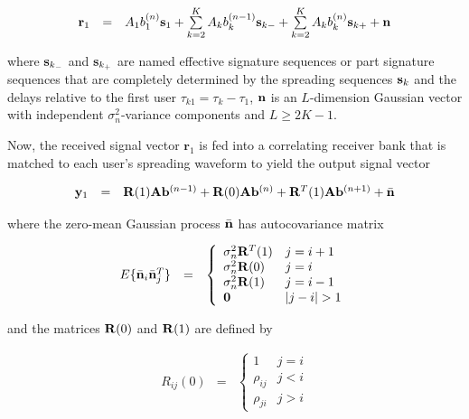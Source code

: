 \documentclass[a4paper,11pt,fleqn]{article}
\newcommand{\br}{{\mathbf r}}
\newcommand{\bA}{{\mathbf A}}
\newcommand{\bb}{{\bf b}}
\newcommand{\bs}{{\bf s}}
\newcommand{\bn}{{\bf n}}
\newcommand{\by}{{\bf y}}
\newcommand{\bR}{{\bf R}}
\begin{document}
\begin{equation}
\begin{array}{rcl}
\br_1&=&A_1b_1^{(n)}\bs_1+\sum\limits_{k=2}^{K}A_k b_k^{(n-1)}
\bs_{k-}+\sum\limits_{k=2}^{K}A_k b_k^{(n)} \bs_{k+} + \bn
\end{array} \label{r}
\end{equation}

\noindent where $\bs_{k_-}$ and $\bs_{k_+}$ are named effective
signature sequences or part signature sequences that are
completely determined by the spreading sequences $\bs_k$ and the
delays relative to the first user $\tau_{k1}=\tau_k-\tau_1$, $\bn$
is an $L$-dimension Gaussian vector with independent
$\sigma_n^2$-variance components and $L \geq 2K-1$.

Now, the received signal vector $\br_1$ is fed into a correlating
receiver bank that is matched to each user's spreading waveform to
yield the output signal vector

\begin{equation}
\begin{array}{rcl}
\by_1&=&\bR(1)\bA\bb^{(n-1)}+\bR(0)\bA\bb^{(n)}+\bR^T(1)\bA\bb^{(n+1)}+\bar{\bn}
\end{array}
\end{equation}

\noindent where the zero-mean Gaussian process $\bar{\bn}$ has
autocovariance matrix

\begin{equation}
\begin{array}{rcl}
E\{\bar{\bn}_i\bar{\bn}_j^T\}&=&\left\{
\begin{array}{ll}
\sigma_n^2\bR^T(1)&j=i+1\\ \sigma_n^2\bR(0)&j=i\\
\sigma_n^2\bR(1)&j=i-1\\ \mathbf{0}&|j-i|>1
\end{array}\right.
\end{array}
\end{equation}

\noindent and the matrices $\bR(0)$ and $\bR(1)$ are defined by

\begin{equation}
\begin{array}{rcl}
R_{ij}(0)&=&\left\{
\begin{array}{ll}
1&j=i\\ \rho_{ij}&j<i\\ \rho_{ji}&j>i
\end{array}\right.
\end{array}
\end{equation}
\end{document}
